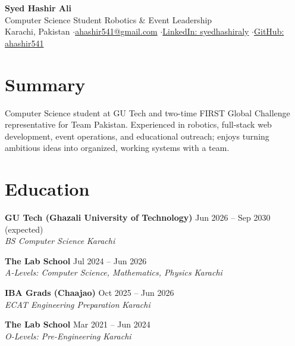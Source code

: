 \documentclass[10pt,a4paper]{article}
\newcommand{\entry}[4]{%
  \vspace{2pt}\textbf{#1} \hfill {\small #2}\\
  \textit{#3} \hfill {\small\textit{#4}}\par}
\begin{document}
\begin{center}
  {\LARGE\bfseries Syed Hashir Ali}\\[3pt]
  {\small Computer Science Student \textperiodcentered{} Robotics \& Event Leadership}\\[3pt]
  {\small Karachi, Pakistan \enspace$\cdot$\enspace \href{mailto:ahashir541@gmail.com}{ahashir541@gmail.com} \enspace$\cdot$\enspace \href{https://www.linkedin.com/in/syedhashiraly}{LinkedIn: syedhashiraly} \enspace$\cdot$\enspace \href{https://github.com/ahashir541}{GitHub: ahashir541}}
\end{center}

\section{Summary}
Computer Science student at GU Tech and two-time FIRST Global Challenge representative for Team Pakistan. Experienced in robotics, full-stack web development, event operations, and educational outreach; enjoys turning ambitious ideas into organized, working systems with a team.

\section{Education}
\entry{GU Tech (Ghazali University of Technology)}{Jun 2026 -- Sep 2030 (expected)}{BS Computer Science}{Karachi}
\entry{The Lab School}{Jul 2024 -- Jun 2026}{A-Levels: Computer Science, Mathematics, Physics}{Karachi}
\entry{IBA Grads (Chaajao)}{Oct 2025 -- Jun 2026}{ECAT Engineering Preparation}{Karachi}
\entry{The Lab School}{Mar 2021 -- Jun 2024}{O-Levels: Pre-Engineering}{Karachi}
\end{document}
